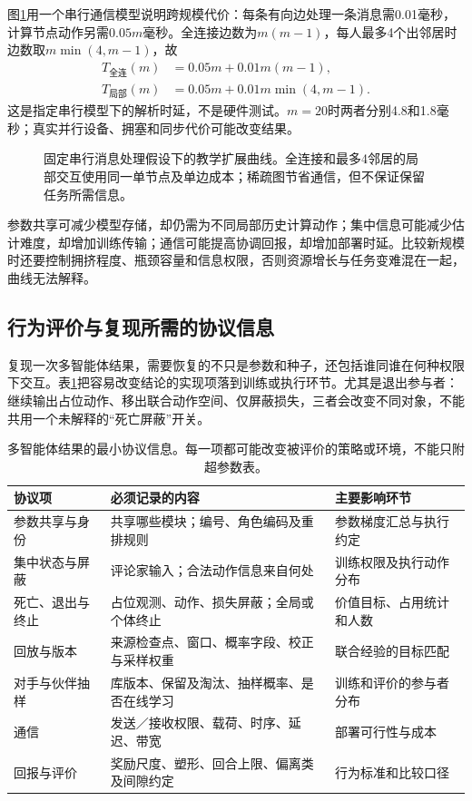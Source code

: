 图\ref{fig:rl-multi-agent-scaling}用一个串行通信模型说明跨规模代价：每条有向边处理一条消息需0.01毫秒，计算节点动作另需$0.05m$毫秒。全连接边数为$m(m-1)$，每人最多4个出邻居时边数取$m\min(4,m-1)$，故
\[
 \begin{aligned}
 T_{\text{全连}}(m)&=0.05m+0.01m(m-1),\\
 T_{\text{局部}}(m)&=0.05m+0.01m\min(4,m-1).
 \end{aligned}
\]
这是指定串行模型下的解析时延，不是硬件测试。$m=20$时两者分别4.8和1.8毫秒；真实并行设备、拥塞和同步代价可能改变结果。

\begin{figure}[htbp]
 \centering
 
 \caption{固定串行消息处理假设下的教学扩展曲线。全连接和最多4邻居的局部交互使用同一单节点及单边成本；稀疏图节省通信，但不保证保留任务所需信息。}
 \label{fig:rl-multi-agent-scaling}
\end{figure}

参数共享可减少模型存储，却仍需为不同局部历史计算动作；集中信息可能减少估计难度，却增加训练传输；通信可能提高协调回报，却增加部署时延。比较新规模时还要控制拥挤程度、瓶颈容量和信息权限，否则资源增长与任务变难混在一起，曲线无法解释。

\subsection{行为评价与复现所需的协议信息}
\label{sec:rl-multi-agent-protocol}

复现一次多智能体结果，需要恢复的不只是参数和种子，还包括谁同谁在何种权限下交互。表\ref{tab:rl-multi-agent-protocol}把容易改变结论的实现项落到训练或执行环节。尤其是退出参与者：继续输出占位动作、移出联合动作空间、仅屏蔽损失，三者会改变不同对象，不能共用一个未解释的“死亡屏蔽”开关。

\begin{table}[htbp]
 \centering
 \begin{tabularx}{\linewidth}{@{}l >{\raggedright\arraybackslash}X >{\raggedright\arraybackslash}X@{}}
 \toprule
 协议项 & 必须记录的内容 & 主要影响环节\\
 \midrule
 参数共享与身份 & 共享哪些模块；编号、角色编码及重排规则 & 参数梯度汇总与执行约定\\
 集中状态与屏蔽 & 评论家输入；合法动作信息来自何处 & 训练权限及执行动作分布\\
 死亡、退出与终止 & 占位观测、动作、损失屏蔽；全局或个体终止 & 价值目标、占用统计和人数\\
 回放与版本 & 来源检查点、窗口、概率字段、校正与采样权重 & 联合经验的目标匹配\\
 对手与伙伴抽样 & 库版本、保留及淘汰、抽样概率、是否在线学习 & 训练和评价的参与者分布\\
 通信 & 发送／接收权限、载荷、时序、延迟、带宽 & 部署可行性与成本\\
 回报与评价 & 奖励尺度、塑形、回合上限、偏离类及间隙约定 & 行为标准和比较口径\\
 \bottomrule
 \end{tabularx}
 \caption{多智能体结果的最小协议信息。每一项都可能改变被评价的策略或环境，不能只附超参数表。}
 \label{tab:rl-multi-agent-protocol}
\end{table}

